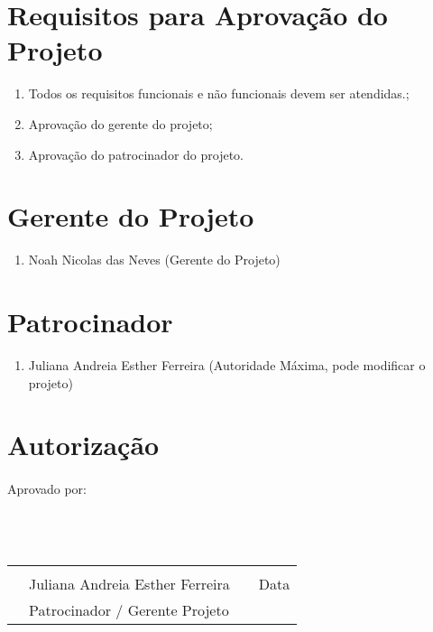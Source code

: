 \section{Requisitos para Aprovação do Projeto}
  \begin{enumerate}
    \item Todos os requisitos funcionais e não funcionais devem ser atendidas.;
    \item Aprovação do gerente do projeto;
    \item Aprovação do patrocinador do projeto.
  \end{enumerate}

\section{Gerente do Projeto}
  \begin{enumerate}
    \item Noah Nicolas das Neves (Gerente do Projeto)
  \end{enumerate}

\section{Patrocinador}
  \begin{enumerate}
    \item Juliana Andreia Esther Ferreira (Autoridade Máxima, pode modificar o projeto)
  \end{enumerate}

\section{Autorização}
\paragraph{}
  Aprovado por: \\ \\ \\ \\
  \begin{tabular}{@{}p{0in}p{3.5in}p{0in}p{2in}@{}}
    &\hrulefill  &  &\hrulefill \\
    &Juliana Andreia Esther Ferreira  &  &Data \\
    &Patrocinador / Gerente Projeto & &
  \end{tabular}


